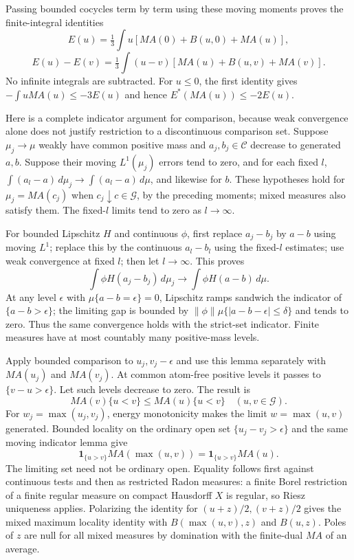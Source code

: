 \documentclass[11pt]{article}
\begin{document}
Passing bounded cocycles term by term using these moving moments proves the finite-integral identities
\[
 E(u)=\tfrac13\int u[MA(0)+B(u,0)+MA(u)],
\]
\[
 E(u)-E(v)=\tfrac13\int(u-v)[MA(u)+B(u,v)+MA(v)].
\]
No infinite integrals are subtracted. For $u\le0$, the first identity gives $-\int uMA(u)\le-3E(u)$ and hence $E^*(MA(u))\le-2E(u)$.

Here is a complete indicator argument for comparison, because weak convergence alone does not justify restriction to a discontinuous comparison set. Suppose $\mu_j\to\mu$ weakly have common positive mass and $a_j,b_j\in\mathcal C$ decrease to generated $a,b$. Suppose their moving $L^1(\mu_j)$ errors tend to zero, and for each fixed $l$, $\int(a_l-a)\,d\mu_j\to\int(a_l-a)\,d\mu$, and likewise for $b$. These hypotheses hold for $\mu_j=MA(c_j)$ when $c_j\downarrow c\in\mathcal G$, by the preceding moments; mixed measures also satisfy them. The fixed-$l$ limits tend to zero as $l\to\infty$.

For bounded Lipschitz $H$ and continuous $\phi$, first replace $a_j-b_j$ by $a-b$ using moving $L^1$; replace this by the continuous $a_l-b_l$ using the fixed-$l$ estimates; use weak convergence at fixed $l$; then let $l\to\infty$. This proves
\[
 \int\phi H(a_j-b_j)\,d\mu_j\longrightarrow\int\phi H(a-b)\,d\mu.
\]
At any level $\epsilon$ with $\mu\{a-b=\epsilon\}=0$, Lipschitz ramps sandwich the indicator of $\{a-b>\epsilon\}$; the limiting gap is bounded by $\|\phi\|\mu\{|a-b-\epsilon|\le\delta\}$ and tends to zero. Thus the same convergence holds with the strict-set indicator. Finite measures have at most countably many positive-mass levels.

Apply bounded comparison to $u_j,v_j-\epsilon$ and use this lemma separately with $MA(u_j)$ and $MA(v_j)$. At common atom-free positive levels it passes to $\{v-u>\epsilon\}$. Let such levels decrease to zero. The result is
\[
 MA(v)\{u<v\}\le MA(u)\{u<v\}\quad(u,v\in\mathcal G).
\]
For $w_j=\max(u_j,v_j)$, energy monotonicity makes the limit $w=\max(u,v)$ generated. Bounded locality on the ordinary open set $\{u_j-v_j>\epsilon\}$ and the same moving indicator lemma give
\[
 \mathbf1_{\{u>v\}}MA(\max(u,v))=\mathbf1_{\{u>v\}}MA(u).
\]
The limiting set need not be ordinary open. Equality follows first against continuous tests and then as restricted Radon measures: a finite Borel restriction of a finite regular measure on compact Hausdorff $X$ is regular, so Riesz uniqueness applies. Polarizing the identity for $(u+z)/2,(v+z)/2$ gives the mixed maximum locality identity with $B(\max(u,v),z)$ and $B(u,z)$. Poles of $z$ are null for all mixed measures by domination with the finite-dual $MA$ of an average.
\end{document}

